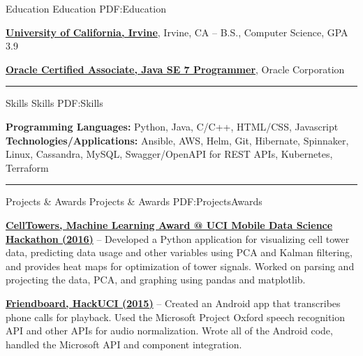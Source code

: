 \documentclass[letterpaper,MMMyyyy,nonstopmode]{simpleresumecv}
\begin{document}
\begin{Body}

	\Section
	{Education}
	{Education}
	{PDF:Education}

	\Entry
	\href{https://uci.edu/}
	{\textbf{University of California, Irvine}},
	Irvine, CA
	\hfill
	 --
	\Gap
	B.S., Computer Science, GPA 3.9\newline

	\Entry
	\href{http://education.oracle.com/pls/web_prod-plq-dad/db_pages.getpage?page_id=5001&get_params=p_exam_id:1Z0-803&p_org_id=&lang=}
	{\textbf{Oracle Certified Associate, Java SE 7 Programmer}},
	Oracle Corporation
	\hfill
	\newline
	\Gap

	\hrule


	\Section
	{Skills}
	{Skills}
	{PDF:Skills}

	\begin{flushleft}
		\textbf{Programming Languages:} Python, Java, C/C++, HTML/CSS, Javascript
		\textbf{Technologies/Applications:} Ansible, AWS, Helm, Git, Hibernate, Spinnaker, 
		Linux, Cassandra, MySQL, Swagger/OpenAPI for REST APIs, Kubernetes, Terraform \newline
	\end{flushleft}

	\hrule


	\Section
	{Projects \& Awards}
	{Projects \& Awards}
	{PDF:ProjectsAwards}

	\Entry
	\href{https://github.com/trizzle21/Datathon2016}
	{\textbf{CellTowers, Machine Learning Award @ UCI Mobile Data Science Hackathon (2016)}} -- Developed a Python application for visualizing cell tower data, predicting data usage and other variables using PCA and Kalman filtering, and provides heat maps for optimization of tower signals. Worked on parsing and projecting the data, PCA, and graphing using pandas and matplotlib.\newline

	\Entry
	\href{https://github.com/SVT125/HackUCI2015}
	{\textbf{Friendboard, HackUCI (2015)}} -- Created an Android app that transcribes phone calls for playback. Used the Microsoft Project Oxford speech recognition API and other APIs for audio normalization. Wrote all of the Android code, handled the Microsoft API and component integration.\newline


\end{Body}
\end{document}
